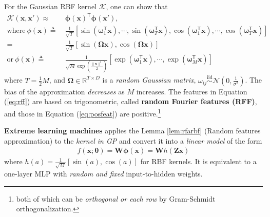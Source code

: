 \begin{lemma}\label{lem:rfarbf}
    For the Gaussian RBF kernel $\mathcal{K}$, one can show that 
    \begin{align}
        \mathcal{K}(\bm{x},\bm{x}')
        \approx&~ \bm{\phi}(\bm{x})^\mathsf{T}\bm{\phi}(\bm{x}'), \\
        \text{where}~\phi(\bm{x})
        \triangleq&~ \frac{1}{\sqrt{T}}\left[
            \sin(\bm{\omega}_1^\mathsf{T}\bm{x}),\cdots,\sin(\bm{\omega}_T^\mathsf{T}\bm{x}),
            \cos(\bm{\omega}_1^\mathsf{T}\bm{x}),\cdots,\cos(\bm{\omega}_T^\mathsf{T}\bm{x})
        \right]\\
        =&~ \frac{1}{\sqrt{T}}\left[
            \sin(\mathbf{\Omega}\bm{x}),\cos(\mathbf{\Omega}\bm{x})
        \right]\label{eq:rff} \\
        \text{or}~\phi(\bm{x})
        \triangleq&~ \frac{1}{\sqrt{M}\exp(\frac{\|\bm{x}\|^2}{2})}\left[
            \exp(\bm{\omega}_1^\mathsf{T}\bm{x}),\cdots,\exp(\bm{\omega}_M^\mathsf{T}\bm{x})
        \right]\label{eq:posfeat}
    \end{align}
    where $T=\frac{1}{2}M$, and $\mathbf{\Omega}\in\mathbb{R}^{T\times D}$ is a \textit{random Gaussian matrix}, 
    $\omega_{ij}\overset{\text{iid}}{\sim}\mathcal{N}(0,\frac{1}{\sigma^2})$. 
    The bias of the approximation \textit{decreases} as $M$ increases. 
    The features in Equation (\ref{eq:rff}) are based on trigonometric, called \textbf{random Fourier features (RFF)}, and those in Equation (\ref{eq:posfeat}) are positive.\footnote{both of which can be \textit{orthogonal or each row} by Gram-Schmidt orthogonalization.}
\end{lemma}

\textbf{Extreme learning machines} applies the Lemma \ref{lem:rfarbf} (Random features approximation) 
to the \textit{kernel in GP} and convert it into a \textit{linear model} of the form
\begin{gather}
    f(\bm{x};\bm{\theta})=\mathbf{W}\bm{\phi}(\bm{x}) = \mathbf{W}h(\mathbf{Z}\bm{x})
\end{gather}
where $h(a)=\frac{1}{\sqrt{M}}[\sin(a),\cos(a)]$ for RBF kernels.
It is equivalent to a one-layer MLP with \textit{random and fixed} input-to-hidden weights.

